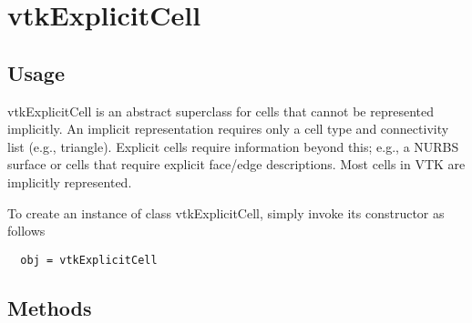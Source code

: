 \section{vtkExplicitCell}

\subsection{Usage}

 vtkExplicitCell is an abstract superclass for cells that cannot be
 represented implicitly. An implicit representation requires only a
 cell type and connectivity list (e.g., triangle). Explicit cells
 require information beyond this; e.g., a NURBS surface or cells that
 require explicit face/edge descriptions. Most cells in VTK are
 implicitly represented.

To create an instance of class vtkExplicitCell, simply
invoke its constructor as follows
\begin{verbatim}
  obj = vtkExplicitCell
\end{verbatim}
\subsection{Methods}

